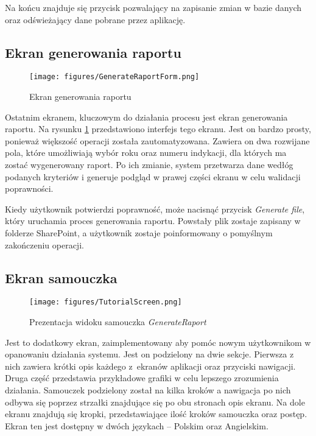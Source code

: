 Na końcu znajduje się przycisk pozwalający na zapisanie zmian w bazie danych oraz odświeżający dane pobrane przez aplikację.

\subsection{Ekran generowania raportu}

\begin{figure}[H]
    \centering
    \texttt{[image: figures/GenerateRaportForm.png]}
    \caption{Ekran generowania raportu}
    \label{fig:generateraportform}
\end{figure}

Ostatnim ekranem, kluczowym do działania procesu jest ekran generowania raportu. Na rysunku \ref{fig:generateraportform} przedstawiono interfejs tego ekranu. Jest on bardzo prosty, ponieważ większość operacji została zautomatyzowana. Zawiera on dwa rozwijane pola, które umożliwiają wybór roku oraz numeru indykacji, dla których ma zostać wygenerowany raport. Po ich zmianie, system przetwarza dane wedłóg podanych kryteriów i generuje podgląd w prawej części ekranu w celu walidacji poprawności.

Kiedy użytkownik potwierdzi poprawność, może nacisnąć przycisk \emph{Generate file}, który uruchamia proces generowania raportu. Powstały plik zostaje zapisany w folderze SharePoint, a użytkownik zostaje poinformowany o pomyślnym zakończeniu operacji.

\subsection{Ekran samouczka}

\begin{figure}[H]
    \centering
    \texttt{[image: figures/TutorialScreen.png]}
    \caption{Prezentacja widoku samouczka \emph{GenerateRaport}}
    \label{fig:tutorial}
\end{figure}

Jest to dodatkowy ekran, zaimplementowany aby pomóc nowym użytkownikom w opanowaniu działania systemu. Jest on podzielony na dwie sekcje. Pierwsza z nich zawiera krótki opis każdego z~ekranów aplikacji oraz przyciski nawigacji. Druga część przedstawia przykładowe grafiki w celu lepszego zrozumienia działania. Samouczek podzielony został na kilka kroków a nawigacja po nich odbywa się poprzez strzałki znajdujące się po obu stronach opis ekranu. Na dole ekranu znajdują się kropki, przedstawiające ilość kroków samouczka oraz postęp. Ekran ten jest dostępny w dwóch językach -- Polskim oraz Angielskim.
